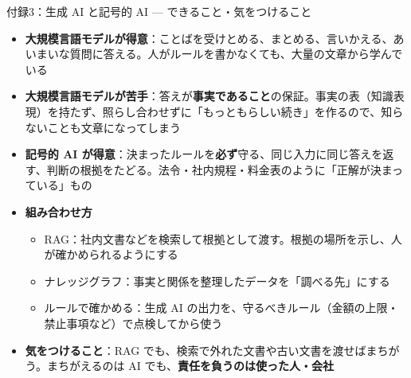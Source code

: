 \documentclass[aspectratio=169]{beamer}
\begin{document}
\begin{frame}{付録3：生成 AI と記号的 AI — できること・気をつけること}
\footnotesize
\begin{itemize}
  \item \textbf{大規模言語モデルが得意}：ことばを受けとめる、まとめる、言いかえる、あいまいな質問に答える。人がルールを書かなくても、大量の文章から学んでいる
  \item \textbf{大規模言語モデルが苦手}：答えが\textbf{事実であること}の保証。事実の表（知識表現）を持たず、照らし合わせずに「もっともらしい続き」を作るので、知らないことも文章になってしまう
  \item \textbf{記号的 AI が得意}：決まったルールを\textbf{必ず}守る、同じ入力に同じ答えを返す、判断の根拠をたどる。法令・社内規程・料金表のように「正解が決まっている」もの
  \item \textbf{組み合わせ方}
  \begin{itemize}\footnotesize
    \item RAG：社内文書などを検索して根拠として渡す。根拠の場所を示し、人が確かめられるようにする
    \item ナレッジグラフ：事実と関係を整理したデータを「調べる先」にする
    \item ルールで確かめる：生成 AI の出力を、守るべきルール（金額の上限・禁止事項など）で点検してから使う
  \end{itemize}
  \item \textbf{気をつけること}：RAG でも、検索で外れた文書や古い文書を渡せばまちがう。まちがえるのは AI でも、\textbf{責任を負うのは使った人・会社}
\end{itemize}
\end{frame}
\end{document}
